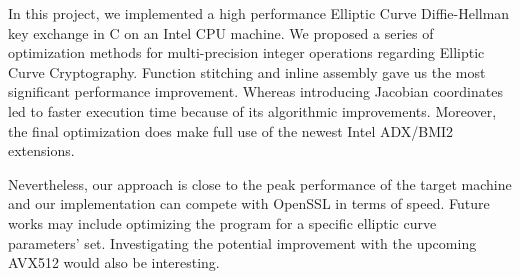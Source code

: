 In this project, we implemented a high performance Elliptic Curve Diffie-Hellman key exchange in C on an Intel CPU machine. We proposed a series of optimization methods for multi-precision integer operations regarding Elliptic Curve Cryptography. Function stitching and inline assembly gave us the most significant performance improvement. Whereas introducing Jacobian coordinates led to faster execution time because of its algorithmic improvements. Moreover, the final optimization does make full use of the newest Intel ADX/BMI2 extensions.

Nevertheless, our approach is close to the peak performance of the target machine and our implementation can compete with OpenSSL in terms of speed. Future works may include optimizing the program for a specific elliptic curve parameters' set. Investigating the potential improvement with the upcoming AVX512 would also be interesting. 